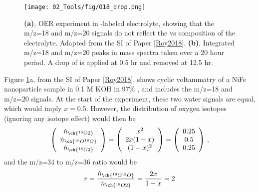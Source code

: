 \begin{figure}[h!]
	\centering
	\texttt{[image: 02\_Tools/fig/O18\_drop.png]}
	\caption{\textbf{(a)}, OER experiment in -labeled electrolyte, showing that the m/z=18 and m/z=20 signals do not reflect the  vs  composition of the electrolyte. Adapted from the SI of Paper \ref{Roy2018}. \textbf{(b)}, Integrated m/z=18 and m/z=20 peaks in mass spectra taken over a 20 hour period. A drop of  is applied at 0.5 hr and removed at 12.5 hr.}
	\label{fig:O18_drop}
\end{figure}
Figure \ref{fig:O18_drop}a, from the SI of Paper \ref{Roy2018}, shows cyclic voltammatry of a NiFe nanoparticle sample in 0.1 M KOH in 97\% , and includes the m/z=18 and m/z=20 signals. At the start of the experiment, these two water signals are equal, which would imply $x=0.5$.
However, the distribution of oxygen isotopes (ignoring any isotope effect) would then be
\begin{equation}
\left(\begin{array}{c}  \dot{n}_{\ch{^{16}O2}} \\  \dot{n}_{\ch{^{16}O^{18}O}}\\  \dot{n}_{\ch{^{18}O2}}
\end{array}  \right) = 
\left(\begin{array}{c}  x^2 \\ 2x(1-x) \\ (1-x)^2 \end{array}  \right) = 
\left(\begin{array}{c}  0.25 \\ 0.5 \\ 0.25 \end{array}  \right)\,,
\end{equation}
and the m/z=34 to m/z=36 ratio would be 
\begin{equation}
r = \frac{\dot{n}_{\ch{^{16}O^{18}O}}}{\dot{n}_{\ch{^{18}O2}}} = \frac{2x}{1-x} = 2
\end{equation}

